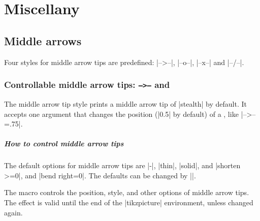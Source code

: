 %


\chapter{Miscellany}
\label{c:misc}

\section{Middle arrows}
\label{s:midarrows}

Four styles for middle arrow tips are predefined: |-->--|, |--o--|, |--x--| and |--/--|.

\subsection{Controllable middle arrow tips: \texttt{-->--} and \protect\cmd{\settzmidarrow}}

The middle arrow tip style \ixxw{-->--} prints a middle arrow tip of |stealth| by default.
It accepts one argument that changes the position (|0.5| by default) of a , like |-->--=.75|.


\begin{tzcode}{.3}
\end{tzcode}


\paragraph{How to control middle arrow tips}
The default options for middle arrow tips are |-|, |thin|, |solid|, and |shorten >=0|, and |bend right=0|. The defaults can be changed by |\settzmidarrow|.

The macro \icmd{\settzmidarrow} controls the position, style, and other options of middle arrow tips. The effect is valid until the end of the |tikzpicture| environment, unless changed again.

